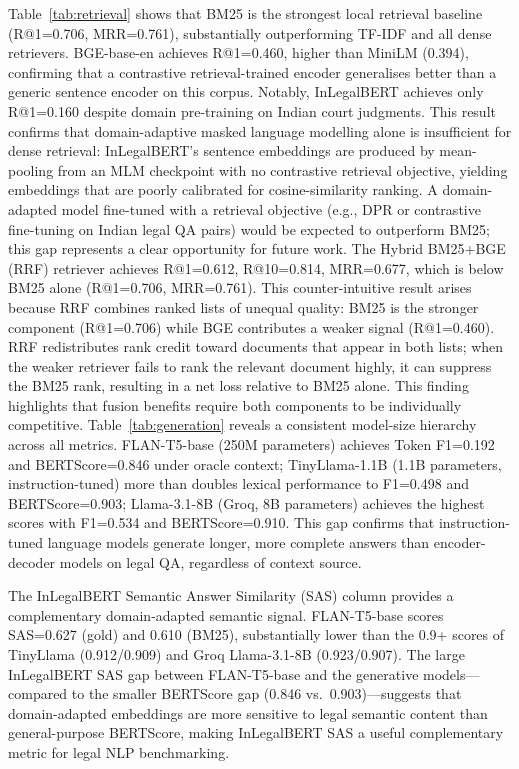 \documentclass{article}
\begin{document}
Table~\ref{tab:retrieval} shows that BM25 is the strongest local retrieval baseline (R@1=0.706, MRR=0.761), substantially outperforming TF-IDF and all dense retrievers. BGE-base-en achieves R@1=0.460, higher than MiniLM (0.394), confirming that a contrastive retrieval-trained encoder generalises better than a generic sentence encoder on this corpus. Notably, InLegalBERT achieves only R@1=0.160 despite domain pre-training on Indian court judgments. This result confirms that domain-adaptive masked language modelling alone is insufficient for dense retrieval: InLegalBERT's sentence embeddings are produced by mean-pooling from an MLM checkpoint with no contrastive retrieval objective, yielding embeddings that are poorly calibrated for cosine-similarity ranking. A domain-adapted model fine-tuned with a retrieval objective (e.g., DPR or contrastive fine-tuning on Indian legal QA pairs) would be expected to outperform BM25; this gap represents a clear opportunity for future work. The Hybrid BM25+BGE (RRF) retriever achieves R@1=0.612, R@10=0.814, MRR=0.677, which is below BM25 alone (R@1=0.706, MRR=0.761). This counter-intuitive result arises because RRF combines ranked lists of unequal quality: BM25 is the stronger component (R@1=0.706) while BGE contributes a weaker signal (R@1=0.460). RRF redistributes rank credit toward documents that appear in both lists; when the weaker retriever fails to rank the relevant document highly, it can suppress the BM25 rank, resulting in a net loss relative to BM25 alone. This finding highlights that fusion benefits require both components to be individually competitive. Table~\ref{tab:generation} reveals a consistent model-size hierarchy across all metrics. FLAN-T5-base (250M parameters) achieves Token F1=0.192 and BERTScore=0.846 under oracle context; TinyLlama-1.1B (1.1B parameters, instruction-tuned) more than doubles lexical performance to F1=0.498 and BERTScore=0.903; Llama-3.1-8B (Groq, 8B parameters) achieves the highest scores with F1=0.534 and BERTScore=0.910. This gap confirms that instruction-tuned language models generate longer, more complete answers than encoder-decoder models on legal QA, regardless of context source.

The InLegalBERT Semantic Answer Similarity (SAS) column provides a complementary domain-adapted semantic signal. FLAN-T5-base scores SAS=0.627 (gold) and 0.610 (BM25), substantially lower than the 0.9+ scores of TinyLlama (0.912/0.909) and Groq Llama-3.1-8B (0.923/0.907). The large InLegalBERT SAS gap between FLAN-T5-base and the generative models—compared to the smaller BERTScore gap (0.846 vs.\ 0.903)—suggests that domain-adapted embeddings are more sensitive to legal semantic content than general-purpose BERTScore, making InLegalBERT SAS a useful complementary metric for legal NLP benchmarking.
\end{document}
